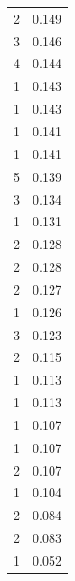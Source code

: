\begin{tabular}{rr}
2 & 0.149 \\
3 & 0.146 \\
4 & 0.144 \\
1 & 0.143 \\
1 & 0.143 \\
1 & 0.141 \\
1 & 0.141 \\
5 & 0.139 \\
3 & 0.134 \\
1 & 0.131 \\
2 & 0.128 \\
2 & 0.128 \\
2 & 0.127 \\
1 & 0.126 \\
3 & 0.123 \\
2 & 0.115 \\
1 & 0.113 \\
1 & 0.113 \\
1 & 0.107 \\
1 & 0.107 \\
2 & 0.107 \\
1 & 0.104 \\
2 & 0.084 \\
2 & 0.083 \\
1 & 0.052 \\
\bottomrule
\end{tabular}
